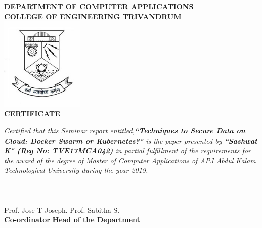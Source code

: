 
\begin{titlepage}
\begin{center}
\textbf{DEPARTMENT OF COMPUTER APPLICATIONS}\\[0.5cm]
\textbf{ COLLEGE OF ENGINEERING TRIVANDRUM}\\
[0.5cm]
\vspace{1.2cm}
\includegraphics[width=0.30\textwidth]{1-title/images/cet.jpg}\\
\vspace{0.8cm}
\textbf{CERTIFICATE}\\
\end{center}
\emph{Certified that this Seminar report entitled,\textbf{``Techniques to Secure Data on Cloud: Docker Swarm or Kubernetes?"} is the paper presented by \textbf{``Sashwat K" (Reg No: TVE17MCA042)} in partial fulfillment of the requirements for the award of the degree of Master of Computer Applications of APJ Abdul Kalam Technological University during the year 2019.}\\\\\\\\
\vspace{0.9cm}
Prof. Jose T Joseph.
\hspace{9.3cm}
Prof. Sabitha S.\\ 
\hspace{5cm}
 \textbf{Co-ordinator}
\hspace{9cm}
\textbf{Head of the Department}

\end{titlepage}
